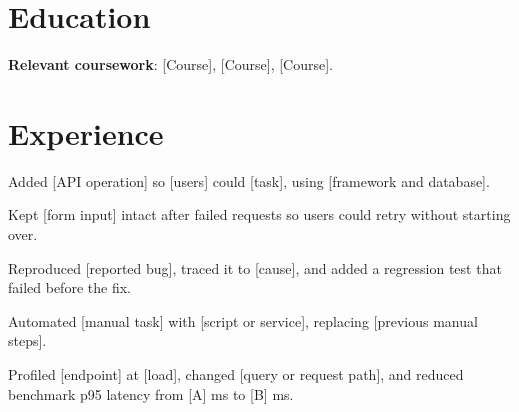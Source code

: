 \documentclass{resume}
\begin{document}

\section{Education}

\begin{jobduties}
  \item \textbf{Relevant coursework}: [Course], [Course], [Course].
\end{jobduties}

\section{Experience}

\begin{jobduties}
  \item Added [API operation] so [users] could [task], using [framework and database].
  \item Kept [form input] intact after failed requests so users could retry without starting over.
  \item Reproduced [reported bug], traced it to [cause], and added a regression test that failed before the fix.
\end{jobduties}

\begin{jobduties}
  \item Automated [manual task] with [script or service], replacing [previous manual steps].
  \item Profiled [endpoint] at [load], changed [query or request path], and reduced benchmark p95 latency from [A] ms to [B] ms.
\end{jobduties}
\end{document}
